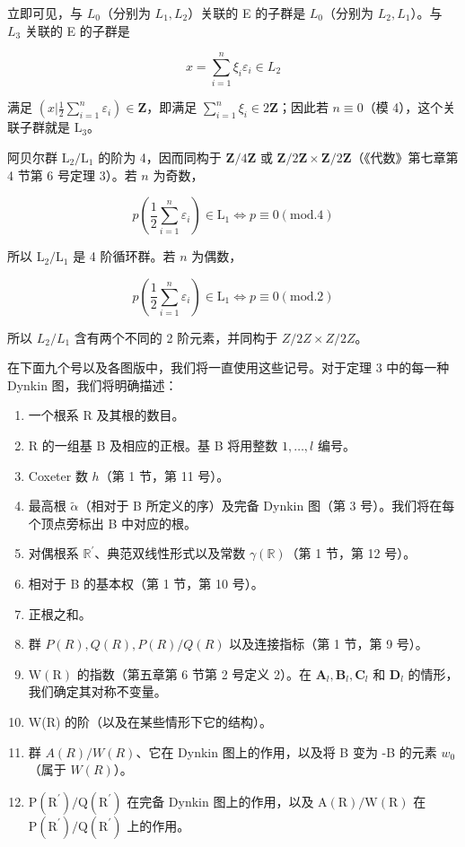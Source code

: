 立即可见，与 \(L_{0}\)（分别为 \(L_{1}, L_{2}\)）关联的 E 的子群是 \(L_{0}\)（分别为 \(L_{2}, L_{1}\)）。与 \(L_{3}\) 关联的 E 的子群是

\[
x = \sum_ {i = 1} ^ {n} \xi_ {i} \varepsilon_ {i} \in L _ {2}
\]

满足 \((x|\frac{1}{2}\sum_{i = 1}^{n}\varepsilon_i)\in \mathbf{Z}\)，即满足 \(\sum_{i = 1}^{n}\xi_{i}\in 2\mathbf{Z}\)；因此若 \(n\equiv 0\)（模 4），这个关联子群就是 \(\mathrm{L}_3\)。

阿贝尔群 \(\mathrm{L}_2 / \mathrm{L}_1\) 的阶为 4，因而同构于 \(\mathbf{Z} / 4\mathbf{Z}\) 或 \(\mathbf{Z} / 2\mathbf{Z} \times \mathbf{Z} / 2\mathbf{Z}\)（《代数》第七章第 4 节第 6 号定理 3）。若 \(n\) 为奇数，

\[
p (\frac {1}{2} \sum_ {i = 1} ^ {n} \varepsilon_ {i}) \in \mathrm{L} _ {1} \Leftrightarrow p \equiv 0 (\mathrm{mod.} 4)
\]

所以 \(\mathrm{L}_2 / \mathrm{L}_1\) 是 4 阶循环群。若 \(n\) 为偶数，

\[
p (\frac {1}{2} \sum_ {i = 1} ^ {n} \varepsilon_ {i}) \in \mathrm{L} _ {1} \Leftrightarrow p \equiv 0 (\mathrm{mod.} 2)
\]

所以 \(L_{2}/L_{1}\) 含有两个不同的 2 阶元素，并同构于 \(Z/2Z \times Z/2Z\)。

在下面九个号以及各图版中，我们将一直使用这些记号。对于定理 3 中的每一种 Dynkin 图，我们将明确描述：

\begin{enumerate}
\def\labelenumi{(\Roman{enumi})}
\item
  一个根系 R 及其根的数目。
\item
  R 的一组基 B 及相应的正根。基 B 将用整数 \(1,\ldots,l\) 编号。
\item
  Coxeter 数 \(h\)（第 1 节，第 11 号）。
\item
  最高根 \(\tilde{\alpha}\)（相对于 B 所定义的序）及完备 Dynkin 图（第 3 号）。我们将在每个顶点旁标出 B 中对应的根。
\item
  对偶根系 \(\mathbb{R}^{\prime}\)、典范双线性形式以及常数 \(\gamma(\mathbb{R})\)（第 1 节，第 12 号）。
\item
  相对于 B 的基本权（第 1 节，第 10 号）。
\item
  正根之和。
\item
  群 \(P(R), Q(R), P(R)/Q(R)\) 以及连接指标（第 1 节，第 9 号）。
\item
  \(\mathrm{W}(\mathrm{R})\) 的指数（第五章第 6 节第 2 号定义 2）。在 \(\mathbf{A}_l, \mathbf{B}_l, \mathbf{C}_l\) 和 \(\mathbf{D}_l\) 的情形，我们确定其对称不变量。
\item
  W(R) 的阶（以及在某些情形下它的结构）。
\item
  群 \(A(R)/W(R)\)、它在 Dynkin 图上的作用，以及将 B 变为 -B 的元素 \(w_{0}\)（属于 \(W(R)\)）。
\item
  \(\mathrm{P}(\mathrm{R}^{\prime})/\mathrm{Q}(\mathrm{R}^{\prime})\) 在完备 Dynkin 图上的作用，以及 \(\mathrm{A}(\mathrm{R})/\mathrm{W}(\mathrm{R})\) 在 \(\mathrm{P}(\mathrm{R}^{\prime})/\mathrm{Q}(\mathrm{R}^{\prime})\) 上的作用。
\end{enumerate}

